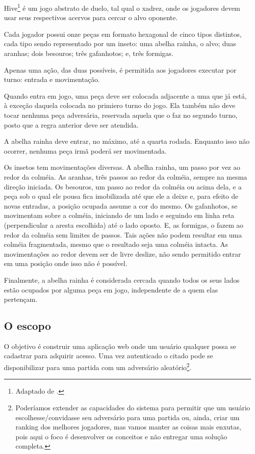 \documentclass[12pt,a4paper,oneside,english,brazil]{article}
\begin{document}
    Hive\footnote{Adaptado de \cite{UltraBoardGames2020}.} é um jogo
    abstrato de duelo, tal qual o xadrez, onde os jogadores devem usar seus
    respectivos acervos para cercar o alvo oponente.

    Cada jogador possui onze peças em formato hexagonal de cinco tipos
    distintos, cada tipo sendo representado por um inseto: uma abelha rainha, o
    alvo; duas aranhas; dois besouros; três gafanhotos; e, três formigas.

    Apenas uma ação, das duas possíveis, é permitida aos jogadores executar por
    turno: entrada e movimentação.

    Quando entra em jogo, uma peça deve ser colocada adjacente a uma que já
    está, à exceção daquela colocada no primiero turno do jogo. Ela também não
    deve tocar nenhuma peça adversária, reservada aquela que o faz no segundo
    turno, posto que a regra anterior deve ser atendida.

    A abelha rainha deve entrar, no máximo, até a quarta rodada. Enquanto isso
    não ocorrer, nenhuma peça irmã poderá ser movimentada.

    Os insetos tem movimentações diversas. A abelha rainha, um passo por vez ao
    redor da colméia. As aranhas, três passos ao redor da colméia, sempre na
    mesma direção iniciada. Os besouros, um passo ao redor da colméia ou acima
    dela, e a peça sob o qual ele pousa fica imobilizada até que ele a deixe e,
    para efeito de novas entradas, a posição ocupada assume a cor do mesmo. Os
    gafanhotos, se movimentam sobre a colméia, iniciando de um lado e seguindo
    em linha reta (perpendicular a aresta escolhida) até o lado oposto.
    E,  as formigas, o fazem ao redor da colméia sem limites de passos. Tais
    ações não podem resultar em uma colméia fragmentada, mesmo que o resultado
    seja uma colméia intacta. As movimentações ao redor devem ser de livre
    deslize, não sendo permitido entrar em uma posição onde isso não é possível.

    Finalmente, a abelha rainha é considerada cercada quando todos os seus lados
    estão ocupados por alguma peça em jogo, independente de a quem elas
    pertençam.


    \subsection{O escopo}

      O objetivo é construir uma aplicação web onde um usuário qualquer possa se
      cadastrar para adquirir acesso. Uma vez autenticado o citado pode se
      disponibilizar para uma partida com um adversário aleatório\footnote{
      Poderíamos extender as capacidades do sistema para permitir que um usuário
      escolhesse/convidasse seu adversário para uma partida ou, ainda, criar um
      ranking dos melhores jogadores, mas vamos manter as coisas mais enxutas,
      pois aqui o foco é desenvolver os conceitos e não entregar uma solução
      completa.}.
\end{document}
